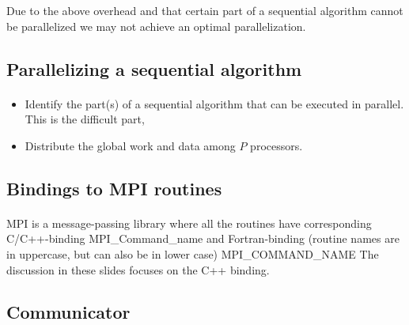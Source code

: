 \documentclass[%
twoside,                 %
final,                   %
10pt]{article}
\begin{document}
\noindent
Due to the above overhead and that certain part of a sequential
algorithm cannot be parallelized we may not achieve an optimal parallelization.




\subsection{Parallelizing a sequential algorithm}

\paragraph{}

\begin{itemize}
\item Identify the part(s) of a sequential algorithm that can be  executed in parallel. This is the difficult part,

\item Distribute the global work and data among $P$ processors.
\end{itemize}

\noindent




\subsection{Bindings to MPI routines}

\paragraph{}


MPI is a message-passing library where all the routines
have corresponding C/C++-binding
\bcppcod
   MPI_Command_name
\ecppcod
and Fortran-binding (routine names are in uppercase, but can also be in lower case)
\bforcod
   MPI_COMMAND_NAME
\eforcod
The discussion in these slides focuses on the C++ binding.




\subsection{Communicator}

\end{document}
